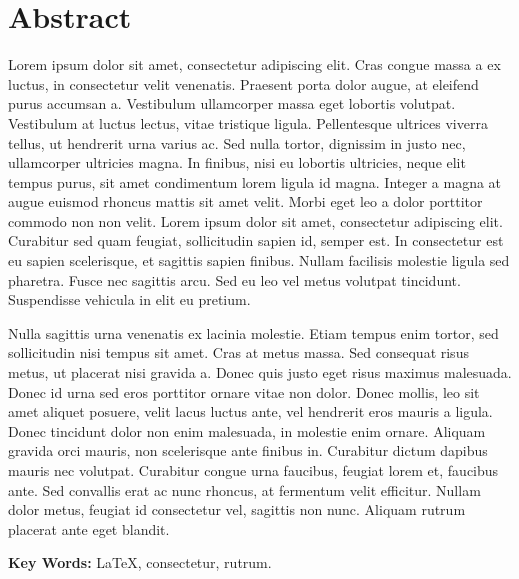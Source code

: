 \chapter{Abstract}

Lorem ipsum dolor sit amet, consectetur adipiscing elit. Cras congue massa a ex luctus, in consectetur velit venenatis. Praesent porta dolor augue, at eleifend purus accumsan a. Vestibulum ullamcorper massa eget lobortis volutpat. Vestibulum at luctus lectus, vitae tristique ligula. Pellentesque ultrices viverra tellus, ut hendrerit urna varius ac. Sed nulla tortor, dignissim in justo nec, ullamcorper ultricies magna. In finibus, nisi eu lobortis ultricies, neque elit tempus purus, sit amet condimentum lorem ligula id magna. Integer a magna at augue euismod rhoncus mattis sit amet velit. Morbi eget leo a dolor porttitor commodo non non velit. Lorem ipsum dolor sit amet, consectetur adipiscing elit. Curabitur sed quam feugiat, sollicitudin sapien id, semper est. In consectetur est eu sapien scelerisque, et sagittis sapien finibus. Nullam facilisis molestie ligula sed pharetra. Fusce nec sagittis arcu. Sed eu leo vel metus volutpat tincidunt. Suspendisse vehicula in elit eu pretium.

Nulla sagittis urna venenatis ex lacinia molestie. Etiam tempus enim tortor, sed sollicitudin nisi tempus sit amet. Cras at metus massa. Sed consequat risus metus, ut placerat nisi gravida a. Donec quis justo eget risus maximus malesuada. Donec id urna sed eros porttitor ornare vitae non dolor. Donec mollis, leo sit amet aliquet posuere, velit lacus luctus ante, vel hendrerit eros mauris a ligula. Donec tincidunt dolor non enim malesuada, in molestie enim ornare. Aliquam gravida orci mauris, non scelerisque ante finibus in. Curabitur dictum dapibus mauris nec volutpat. Curabitur congue urna faucibus, feugiat lorem et, faucibus ante. Sed convallis erat ac nunc rhoncus, at fermentum velit efficitur. Nullam dolor metus, feugiat id consectetur vel, sagittis non nunc. Aliquam rutrum placerat ante eget blandit.

\textbf{Key Words:} \LaTeX{}, consectetur, rutrum.